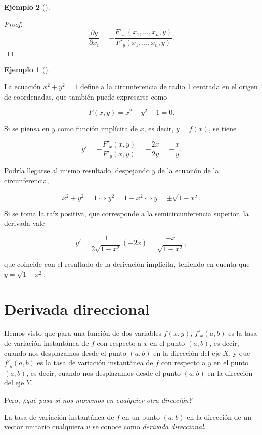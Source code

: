 \documentclass[
  a4paper,
]{scrreport}
\theoremstyle{definition}
\newtheorem{example}{Ejemplo}[chapter]
\theoremstyle{plain}
\theoremstyle{definition}
\theoremstyle{definition}
\theoremstyle{plain}
\theoremstyle{plain}
\theoremstyle{remark}
\begin{document}
\begin{example}[]
\begin{tcolorbox}
\begin{proof}
\[
\frac{\partial y}{\partial x_i} = -\frac{F'_{x_i}(x_1,\ldots,x_n,y)}{F'_{y}(x_1,\ldots,x_n,y)}.
\]
\end{proof}

\end{tcolorbox}

\begin{example}[]\protect\hypertarget{exm-derivada-implicita}{}\label{exm-derivada-implicita}

La ecuación \(x^2+y^2=1\) define a la circunferencia de radio 1 centrada
en el origen de coordenadas, que también puede expresarse como

\[
F(x,y) = x^2+y^2-1 = 0.
\]

Si se piensa en \(y\) como función implícita de \(x\), es decir,
\(y=f(x)\), se tiene

\[
y'=-\frac{F'_x(x,y)}{F'_y(x,y)} = -\frac{2x}{2y}=-\frac{x}{y}.
\]

Podría llegarse al mismo resultado, despejando \(y\) de la ecuación de
la circunferencia,

\[
x^2+y^2=1 \Leftrightarrow y^2=1-x^2 \Leftrightarrow y= \pm\sqrt{1-x^2}.
\]

Si se toma la raíz positiva, que corresponde a la semicircunferencia
superior, la derivada vale

\[
y' = \frac{1}{2\sqrt{1-x^2}}(-2x) = \frac{-x}{\sqrt{1-x^2}},
\]

que coincide con el resultado de la derivación implícita, teniendo en
cuenta que \(y=\sqrt{1-x^2}\).

\end{example}

\section{Derivada direccional}\label{derivada-direccional}

Hemos visto que para una función de dos variables \(f(x,y)\),
\(f'_x(a,b)\) es la tasa de variación instantánea de \(f\) con respecto
a \(x\) en el punto \((a,b)\), es decir, cuando nos desplazamos desde el
punto \((a,b)\) en la dirección del eje \(X\), y que \(f'_y(a,b)\) es la
tasa de variación instantánea de \(f\) con respecto a \(y\) en el punto
\((a,b)\), es decir, cuando nos desplazamos desde el punto \((a,b)\) en
la dirección del eje \(Y\).

Pero, \emph{¿qué pasa si nos movemos en cualquier otra dirección?}

La tasa de variación instantánea de \(f\) en un punto \((a,b)\) en la
dirección de un vector unitario cualquiera \(u\) se conoce como
\emph{derivada direccional}.


\end{example}
\end{document}
